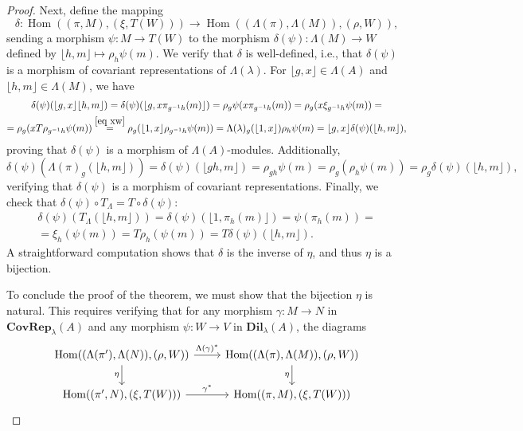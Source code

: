 \documentclass[10pt,a4paper]{amsart}
\newcommand{\Hom}{\operatorname{Hom}}
\begin{document}
\begin{proof}
    Next, define the mapping
    \[
        \delta: \Hom((\pi, M), (\xi, T(W))) \to \Hom((\Lambda(\pi), \Lambda(M)), (\rho, W)),
    \]
    sending a morphism \(\psi: M \to T(W)\) to the morphism \(\delta(\psi): \Lambda(M) \to W\) defined by \(\lfloor h, m \rfloor \mapsto \rho_h\psi(m)\). We verify that \(\delta\) is well-defined, i.e., that \(\delta(\psi)\) is a morphism of covariant representations of \(\Lambda(\lambda)\). For \(\lfloor g, x \rfloor \in \Lambda(A)\) and \(\lfloor h, m \rfloor \in \Lambda(M)\), we have
    \begin{multline*}
        \delta(\psi)(\lfloor g,x\rfloor \lfloor h,m\rfloor)=\delta(\psi)(\lfloor g,x\pi_{g^{-1}h}(m)\rfloor)=\rho_g \psi(x\pi_{g^{-1}h}(m))=\rho_g(x\xi_{g^{-1}h}\psi(m))= \\ =\rho_g(xT\rho_{g^{-1}h}\psi(m)) \overset{\scriptsize\eqref{eq xw}}{=} \rho_g(\lfloor 1,x\rfloor\rho_{g^{-1}h}\psi(m))=\Lambda(\lambda)_g(\lfloor 1,x\rfloor) \rho_h\psi(m)=\lfloor g,x\rfloor \delta(\psi)(\lfloor h,m\rfloor),
    \end{multline*}
    proving that \(\delta(\psi)\) is a morphism of \(\Lambda(A)\)-modules. Additionally,
    \[
        \delta(\psi)(\Lambda(\pi)_g(\lfloor h, m \rfloor)) = \delta(\psi)(\lfloor gh, m \rfloor) = \rho_{gh}\psi(m) = \rho_g(\rho_h\psi(m)) = \rho_g\delta(\psi)(\lfloor h, m \rfloor),
    \]
    verifying that \(\delta(\psi)\) is a morphism of covariant representations. Finally, we check that \(\delta(\psi) \circ T_\Lambda = T \circ \delta(\psi)\):
\begin{multline*}
\delta(\psi)(T_\Lambda(\lfloor h, m \rfloor)) = \delta(\psi)(\lfloor 1, \pi_h(m) \rfloor) = \psi(\pi_h(m)) =\\= \xi_h(\psi(m)) = T\rho_h(\psi(m)) = T\delta(\psi)(\lfloor h, m \rfloor).
\end{multline*}    
A straightforward computation shows that \(\delta\) is the inverse of \(\eta\), and thus \(\eta\) is a bijection.

    To conclude the proof of the theorem, we must show that the bijection \(\eta\) is natural. This requires verifying that for any morphism \(\gamma: M \to N\) in  \(\textbf{CovRep}_{\lambda}(A)\)  and any morphism \(\psi: W \to V\) in  \(\textbf{Dil}_{\lambda}(A)\), the  diagrams 
    \[
        \begin{tikzcd}
            \Hom((\Lambda({\pi}'), \Lambda(N)), (\rho, W)) 
            \arrow[r, "\Lambda(\gamma)^*"] 
            \arrow[d, "\eta"'] 
            & \Hom((\Lambda(\pi), \Lambda(M)), (\rho, W))  
            \arrow[d, "\eta"']  \\
            \Hom(({\pi}', N), (\xi, T(W))) 
            \arrow[r, "\gamma^*"] 
            & \Hom((\pi, M), (\xi, T(W)))  
        \end{tikzcd}
    \]
    

\end{proof}
\end{document}
